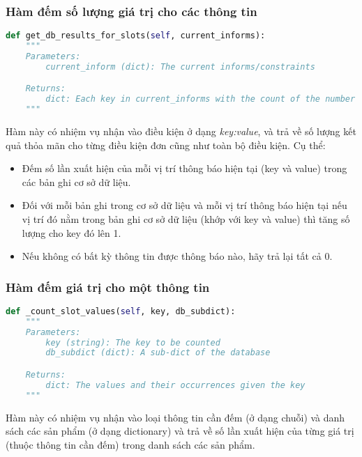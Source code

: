\subsubsection{Hàm đếm số lượng giá trị cho các thông tin}

\renewcommand{\lstlistingname}{Hàm}
\begin{lstlisting}[caption={Hàm đếm số lượng giá trị cho các thông tin},language=python]
def get_db_results_for_slots(self, current_informs):
    """
    Parameters:
        current_inform (dict): The current informs/constraints

    Returns:
        dict: Each key in current_informs with the count of the number of matches for that key
    """
\end{lstlisting}

Hàm này có nhiệm vụ nhận vào điều kiện ở dạng \textit{key:value}, và
trả về số lượng kết quả thỏa mãn cho từng điều kiện đơn cũng như
toàn bộ điều kiện. Cụ thể:

\begin{itemize}
    \item Đếm số lần xuất hiện của mỗi vị trí thông báo hiện tại
    (key và value) trong các bản ghi cơ sở dữ liệu.
    \item Đối với mỗi bản ghi trong cơ sở dữ liệu và mỗi vị trí
    thông báo hiện tại nếu vị trí đó nằm trong bản ghi cơ sở dữ liệu
    (khớp với key và value) thì tăng số lượng cho key đó lên 1.
    \item Nếu không có bất kỳ thông tin được thông báo nào,
    hãy trả lại tất cả 0.
\end{itemize}

\subsubsection{Hàm đếm giá trị cho một thông tin}

\renewcommand{\lstlistingname}{Hàm}
\begin{lstlisting}[caption={Hàm đếm giá trị cho một thông tin},language=python]
def _count_slot_values(self, key, db_subdict):
    """
    Parameters:
        key (string): The key to be counted
        db_subdict (dict): A sub-dict of the database

    Returns:
        dict: The values and their occurrences given the key
    """
\end{lstlisting}

Hàm này có nhiệm vụ nhận vào loại thông tin cần đếm (ở dạng chuỗi)
và danh sách các sản phẩm (ở dạng dictionary) và trả về số lần
xuất hiện của từng giá trị (thuộc thông tin cần đếm)
trong danh sách các sản phẩm.

